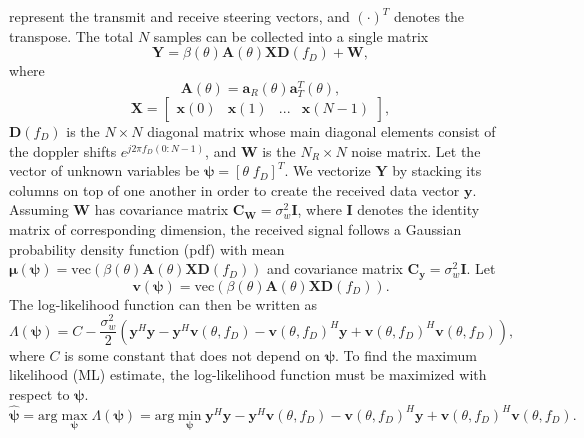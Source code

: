 \documentclass[journal,draftcls,onecolumn,twoside]{IEEEtran}
\begin{document}
represent the transmit and receive steering vectors, and $(\cdot)^{T}$ denotes the transpose. The total $N$ samples can be collected into a single matrix
\begin{equation}
\mathbf{Y} = \beta(\theta)\mathbf{A}(\theta)\mathbf{X}\mathbf{D}(f_{D}) + \mathbf{W},
\end{equation}
where
\begin{equation}
\mathbf{A}(\theta) = \mathbf{a}_{R}(\theta)\mathbf{a}_{T}^{T}(\theta),
\end{equation}
\begin{equation}
\mathbf{X} = \begin{bmatrix}\mathbf{x}(0) & \mathbf{x}(1) & ... & \mathbf{x}(N-1)\end{bmatrix},
\end{equation}
$\mathbf{D}(f_{D})$ is the $N \times N$ diagonal matrix whose main diagonal elements consist of the doppler shifts $e^{j2\pi f_{D}(0:N-1)}$, and $\mathbf{W}$ is the $N_{R} \times N$ noise matrix. Let the vector of unknown variables be $\mathbf{\psi} = [\theta \; f_{D}]^{T}$. We vectorize $\mathbf{Y}$ by stacking its columns on top of one another in order to create the received data vector $\mathbf{y}$. Assuming $\mathbf{W}$ has covariance matrix $\mathbf{C_{W}} = \sigma_w^{2}\mathbf{I}$, where $\mathbf{I}$ denotes the identity matrix of corresponding dimension, the received signal follows a Gaussian probability density function (pdf) with mean $\mathbf{\mu}(\mathbf{\psi}) = \mathrm{vec}(\beta(\theta)\mathbf{A}(\theta)\mathbf{X}\mathbf{D}(f_{D}))$ and covariance matrix $\mathbf{C_{y}} = \sigma_w^{2}\mathbf{I}$. Let
\begin{equation}
\mathbf{v}(\mathbf{\psi}) = \mathrm{vec}(\beta(\theta)\mathbf{A}(\theta)\mathbf{X}\mathbf{D}(f_{D})).
\end{equation}
The log-likelihood function can then be written as
\begin{equation}
\Lambda(\mathbf{\psi}) = C - \frac{\sigma_{w}^{2}}{2}\left(\mathbf{y}^{H}\mathbf{y} - \mathbf{y}^{H}\mathbf{v}(\theta,f_{D}) - \mathbf{v}(\theta,f_{D})^{H}\mathbf{y} + \mathbf{v}(\theta,f_{D})^{H}\mathbf{v}(\theta,f_{D})\right),
\end{equation}
where $C$ is some constant that does not depend on $\mathbf{\psi}$.
To find the maximum likelihood (ML) estimate, the log-likelihood function must be maximized with respect to $\mathbf{\psi}$.
\begin{equation}
\hat{\mathbf{\psi}} = \mathrm{arg} \; \underset{\mathbf{\psi}}{\mathrm{max}} \; \Lambda(\mathbf{\psi}) = \mathrm{arg} \; \underset{\mathbf{\psi}}{\mathrm{min}} \; \mathbf{y}^{H}\mathbf{y} - \mathbf{y}^{H}\mathbf{v}(\theta,f_{D}) - \mathbf{v}(\theta,f_{D})^{H}\mathbf{y} + \mathbf{v}(\theta,f_{D})^{H}\mathbf{v}(\theta,f_{D}).
\end{equation}
\end{document}
